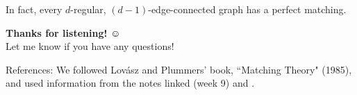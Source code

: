 \begin{frame}
\begin{center}
\Large In fact, every \( d \)-regular, \( (d-1) \)-edge-connected graph has a perfect matching.
\end{center}
\end{frame}

\begin{frame}
\begin{center}
	\vspace{2.5cm}
	{\huge \textbf{Thanks for listening!} $\smiley$} \\
	\Large Let me know if you have any questions! \pause
\end{center}
\vspace{1.8cm}
References: We followed Lov\'asz and Plummers' book, ``Matching Theory" (1985), and used information from the notes linked {} (week 9) and {}.
\end{frame}
